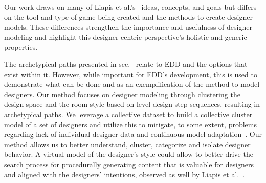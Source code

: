 


Our work draws on many of Liapis et al.'s~ ideas, concepts, and goals but differs on the tool and type of game being created and the methods to create designer models. These differences strengthen the importance and usefulness of designer modeling and highlight this designer-centric perspective's holistic and generic properties.

The archetypical paths presented in sec.~ relate to EDD and the options that exist within it. However, while important for EDD's development, this is used to demonstrate what can be done and as an exemplification of the method to model designers. Our method focuses on designer modeling through clustering the design space and the room style based on level design step sequences, resulting in archetypical paths. We leverage a collective dataset to build a collective cluster model of a set of designers and utilize this to mitigate, to some extent, problems regarding lack of individual designer data and continuous model adaptation~. Our method allows us to better understand, cluster, categorize and isolate designer behavior. A virtual model of the designer's style could allow to better drive the search process for procedurally generating content that is valuable for designers and aligned with the designers' intentions, observed as well by Liapis et al.~.



